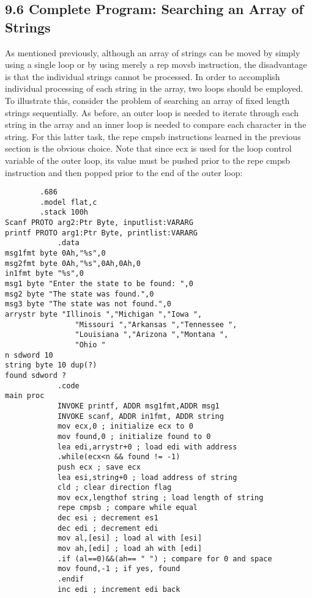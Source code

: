 \documentclass[10pt]{article}
\begin{document}
\subsection*{9.6 Complete Program: Searching an Array of Strings}
As mentioned previously, although an array of strings can be moved by simply using a single loop or by using merely a rep movsb instruction, the disadvantage is that the individual strings cannot be processed. In order to accomplish individual processing of each string in the array, two loops should be employed. To illustrate this, consider the problem of searching an array of fixed length strings sequentially. As before, an outer loop is needed to iterate through each string in the array and an inner loop is needed to compare each character in the string. For this latter task, the repe cmpsb instructions learned in the previous section is the obvious choice. Note that since ecx is used for the loop control variable of the outer loop, its value must be pushed prior to the repe cmpsb instruction and then popped prior to the end of the outer loop:

\begin{verbatim}
        .686
        .model flat,c
        .stack 100h
Scanf PROTO arg2:Ptr Byte, inputlist:VARARG
printf PROTO arg1:Ptr Byte, printlist:VARARG
            .data
msg1fmt byte 0Ah,"%s",0
msg2fmt byte 0Ah,"%s",0Ah,0Ah,0
in1fmt byte "%s",0
msg1 byte "Enter the state to be found: ",0
msg2 byte "The state was found.",0
msg3 byte "The state was not found.",0
arrystr byte "Illinois ","Michigan ","Iowa ",
                "Missouri ","Arkansas ","Tennessee ",
                "Louisiana ","Arizona ","Montana ",
                "Ohio "
n sdword 10
string byte 10 dup(?)
found sdword ?
            .code
main proc
            INVOKE printf, ADDR msg1fmt,ADDR msg1
            INVOKE scanf, ADDR in1fmt, ADDR string
            mov ecx,0 ; initialize ecx to 0
            mov found,0 ; initialize found to 0
            lea edi,arrystr+0 ; load edi with address
            .while(ecx<n && found != -1)
            push ecx ; save ecx
            lea esi,string+0 ; load address of string
            cld ; clear direction flag
            mov ecx,lengthof string ; load length of string
            repe cmpsb ; compare while equal
            dec esi ; decrement es1
            dec edi ; decrement edi
            mov al,[esi] ; load al with [esi]
            mov ah,[edi] ; load ah with [edi]
            .if (al==0)&&(ah== " ") ; compare for 0 and space
            mov found,-1 ; if yes, found
            .endif
            inc edi ; increment edi back
\end{verbatim}
\end{document}
